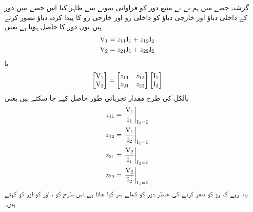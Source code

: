 گزشتہ حصے میں ہم نے بے منبع دور  کو فراوانی نمونے سے ظاہر کیا۔اس حصے میں دور کے داخلی دباؤ   اور خارجی دباؤ   کو داخلی رو  اور خارجی رو  کا پیدا کردہ دباؤ تصور کرتے ہیں۔یوں دور کا  حاصل ہوتا ہے یعنی  
\begin{gather}
\begin{aligned}\label{مساوات_چار_سر_رکاوٹی_الف}
{\ensuremath{{\textup{V}}}}_1&=z_{11}{{\textup{I}}}_1+z_{12}{{\textup{I}}}_2\\
{{\textup{V}}}_2&=z_{21} {{\textup{I}}}_1+z_{22} {{\textup{I}}}_2
\end{aligned}
\end{gather}
یا
\begin{align}\label{مساوات_نمونہ_رکاوٹی}
\begin{bmatrix}
{\ensuremath{{\textup{V}}}}_1\\
{{\textup{V}}}_2
\end{bmatrix}
=
\begin{bmatrix}
z_{11} & z_{12}\\
z_{21}& z_{22}
\end{bmatrix}
\begin{bmatrix}
{\ensuremath{{\textup{I}}}}_1\\
{{\textup{I}}}_2
\end{bmatrix}
\end{align}
بالکل  کی طرح  مقدار تجرباتی طور حاصل کیے جا سکتے ہیں یعنی
\begin{gather}
\begin{aligned} 
z_{11}&=\left. \frac{{{\textup{V}}}_1}{{{\textup{I}}}_1}\right|_{{{\textup{I}}}_2=0}\\
z_{12}&=\left. \frac{{{\textup{V}}}_1}{{{\textup{I}}}_2}\right|_{{{\textup{I}}}_1=0}\\
z_{21}&=\left. \frac{{{\textup{V}}}_2}{{{\textup{I}}}_1}\right|_{{{\textup{I}}}_2=0}\\
z_{22}&=\left. \frac{{{\textup{V}}}_2}{{{\textup{I}}}_2}\right|_{{{\textup{I}}}_1=0}
\end{aligned}
\end{gather}
یاد رہے کہ رو کو صفر کرنے کی خاطر دور کو کھلے سر کیا جاتا ہے۔اس طرح  کو ،  اور  کو  اور  کو  کہتے ہیں۔

